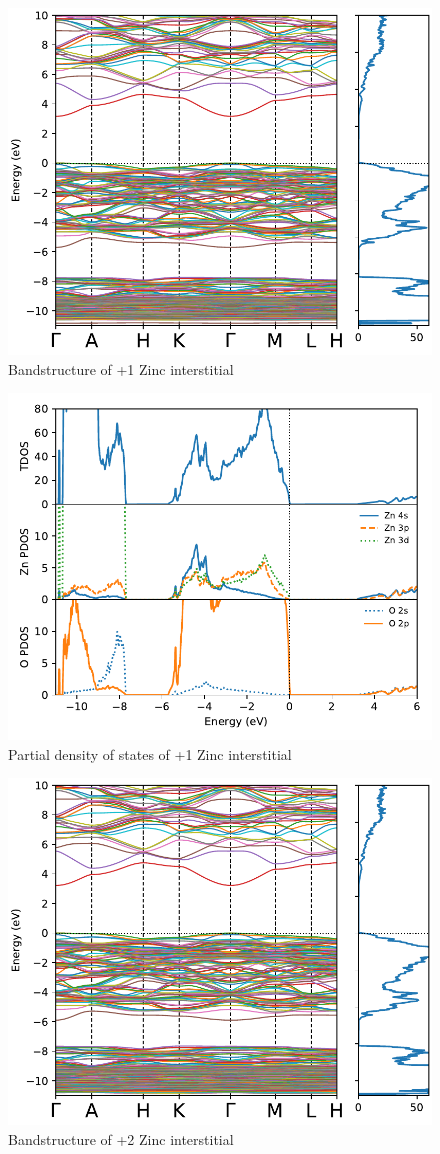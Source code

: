 \begin{figure}[tbh!]
	\centering
	\includegraphics[width=0.6\linewidth]{"images/rnd/band-dos_Zn_i-p1"}
	\caption[Bandstructure of +1 Zinc interstitial]{Bandstructure of +1 Zinc interstitial}
	\label{fig:band-dos_Zn_i-p1}
\end{figure}

\begin{figure}[tbh!]
	\centering
	\includegraphics[width=0.6\linewidth]{"images/rnd/dos-pdos_Zn_i-p1"}
	\caption[Partial density of states of +1 Zinc interstitial]{Partial density of states of +1 Zinc interstitial }
	\label{fig:dos-pdos_Zn_i-p1}
\end{figure}


\begin{figure}[tbh!]
	\centering
	\includegraphics[width=0.6\linewidth]{"images/rnd/band-dos_Zn_i-p2"}
	\caption[Bandstructure of +2 Zinc interstitial]{Bandstructure of +2 Zinc interstitial}
	\label{fig:band-dos_Zn_i-p2}
\end{figure}

